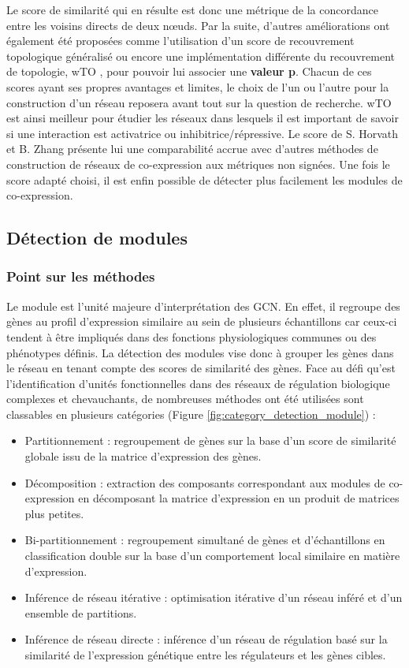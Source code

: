 Le score de similarité qui en résulte est donc une métrique de la concordance entre les voisins directs de deux nœuds. Par la suite, d'autres améliorations ont également été proposées comme l'utilisation d'un score de recouvrement topologique généralisé \cite{Yip2007Dec} ou encore une implémentation différente du recouvrement de topologie, wTO \cite{Gysi2018}, pour pouvoir lui associer une \textbf{valeur p}. Chacun de ces scores ayant ses propres avantages et limites, le choix de l'un ou l'autre pour la construction d'un réseau reposera avant tout sur la question de recherche. wTO est ainsi meilleur pour étudier les réseaux dans lesquels il est important de savoir si une interaction est activatrice ou inhibitrice/répressive. Le score de S. Horvath et B. Zhang présente lui une comparabilité accrue avec d'autres méthodes de construction de réseaux de co-expression aux métriques non signées. Une fois le score adapté choisi, il est enfin possible de détecter plus facilement les modules de co-expression.



\subsection{Détection de modules}

\subsubsection{Point sur les méthodes}

Le module est l'unité majeure d'interprétation des \acrshort{GCN}. En effet, il regroupe des gènes au profil d'expression similaire au sein de plusieurs échantillons car ceux-ci tendent à être impliqués dans des fonctions physiologiques communes ou des phénotypes définis. La détection des modules vise donc à grouper les gènes dans le réseau en tenant compte des scores de similarité des gènes. Face au défi qu'est l'identification d'unités fonctionnelles dans des réseaux de régulation biologique complexes et chevauchants, de nombreuses méthodes ont été utilisées sont classables en plusieurs catégories (Figure \ref{fig:category_detection_module}) \cite{Saelens2018} : 
\begin{itemize}
    \item Partitionnement : regroupement de gènes sur la base d'un score de similarité globale issu de la matrice d'expression des gènes.
    \item Décomposition : extraction des composants correspondant aux modules de co-expression en décomposant la matrice d'expression en un produit de matrices plus petites.
    \item Bi-partitionnement : regroupement simultané de gènes et d'échantillons en classification double sur la base d'un comportement local similaire en matière d'expression.
    \item Inférence de réseau itérative : optimisation itérative d'un réseau inféré et d'un ensemble de partitions.
    \item Inférence de réseau directe : inférence d'un réseau de régulation basé sur la similarité de l'expression génétique entre les régulateurs et les gènes cibles.
\end{itemize} 
\hfill


